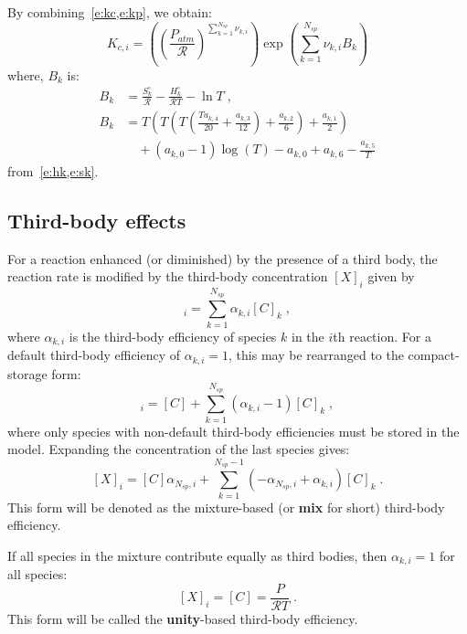 \documentclass[12pt,number,sort&compress]{elsarticle}
\newcommand{\ns}{N_{sp}}
\newcommand{\Ru}{\mathcal{R}}
\begin{document}
By combining~\cref{e:kc,e:kp}, we obtain:
\begin{equation}
 \label{e:kc_in_kp}
 {K_{c, i}} = \left(\left(\frac{P_{atm}}{\Ru}\right)^{\sum_{k=1}^{\ns} \nu_{k,i}}\right) \operatorname{exp}\left({\sum_{k=1}^{\ns} \nu_{k,i} B_{k}}\right)
\end{equation}
where, $B_k$ is:
\begin{align}
 \label{e:Bk}
 B_{k} &= \frac{S^{\circ}_k}{\Ru} - \frac{H^{\circ}_k}{\Ru T} - \ln{T} \nonumber\; , \\
 B_{k} &= T \left(T \left(T \left(\frac{T a_{k,4}}{20} + \frac{a_{k,3}}{12}\right) + \frac{a_{k,2}}{6}\right) + \frac{a_{k,1}}{2}\right) \nonumber \\
       & \quad + \left(a_{k,0} - 1\right) \log{\left (T \right )} - a_{k,0} + a_{k,6} - \frac{a_{k,5}}{T}
\end{align}
from~\cref{e:hk,e:sk}.

\subsection{Third-body effects}
\label{s:thdbody}

For a reaction enhanced (or diminished) by the presence of a third body, the reaction rate is modified by the third-body concentration $[X]_i$ given by
\begin{equation}
[X]_{i} = \sum_{k=1}^{\ns} \alpha_{k,i} [C]_{k} \;,
\end{equation}
where $\alpha_{k,i}$ is the third-body efficiency of species $k$ in the $i$th reaction.
For a default third-body efficiency of $\alpha_{k,i} = 1$, this may be rearranged to the compact-storage form:
\begin{equation}
 [X]_{i} = [C] + \sum_{k=1}^{\ns} \left(\alpha_{k,i} - 1\right) [C]_{k} \;,
\end{equation}
where only species with non-default third-body efficiencies must be stored in the model.
Expanding the concentration of the last species gives:
\begin{equation}
\label{e:thd_mix}
 [X]_{i}=[C] \alpha_{\ns,i} + \sum_{k=1}^{\ns  - 1} \left(- \alpha_{\ns,i} + \alpha_{k,i}\right) [C]_{k}\;.
\end{equation}
This form will be denoted as the mixture-based (or \textbf{mix} for short) third-body efficiency.

If all species in the mixture contribute equally as third bodies, then $\alpha_{k,i} = 1$ for all species:
\begin{equation}
\label{e:thd_unity}
 [X]_{i} = [C] = \frac{P}{\Ru T} \;.
\end{equation}
This form will be called the \textbf{unity}-based third-body efficiency.
\end{document}
